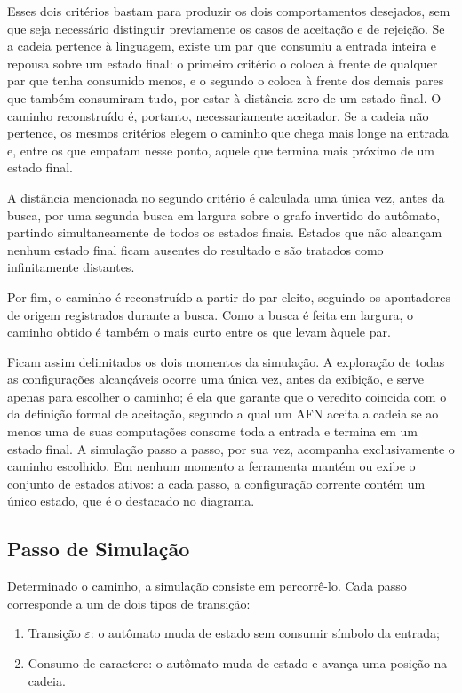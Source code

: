 \documentclass[
    12pt
    ,oneside
    ,a4paper
    ,chapter=TITLE
    ,section=TITLE
    ,sumario=abnt-6027-2012]{abntex2}
\begin{document}
Esses dois critérios bastam para produzir os dois comportamentos desejados, sem que
seja necessário distinguir previamente os casos de aceitação e de rejeição. Se a cadeia
pertence à linguagem, existe um par que consumiu a entrada inteira e repousa sobre um
estado final: o primeiro critério o coloca à frente de qualquer par que tenha consumido
menos, e o segundo o coloca à frente dos demais pares que também consumiram tudo, por
estar à distância zero de um estado final. O caminho reconstruído é, portanto,
necessariamente aceitador. Se a cadeia não pertence, os mesmos critérios elegem o
caminho que chega mais longe na entrada e, entre os que empatam nesse ponto, aquele que
termina mais próximo de um estado final.

A distância mencionada no segundo critério é calculada uma única vez, antes da busca,
por uma segunda busca em largura sobre o grafo invertido do autômato, partindo
simultaneamente de todos os estados finais. Estados que não alcançam nenhum estado
final ficam ausentes do resultado e são tratados como infinitamente distantes.

Por fim, o caminho é reconstruído a partir do par eleito, seguindo os apontadores de
origem registrados durante a busca. Como a busca é feita em largura, o caminho obtido é
também o mais curto entre os que levam àquele par.

Ficam assim delimitados os dois momentos da simulação. A exploração de todas as
configurações alcançáveis ocorre uma única vez, antes da exibição, e serve apenas para
escolher o caminho; é ela que garante que o veredito coincida com o da definição formal
de aceitação, segundo a qual um AFN aceita a cadeia se ao menos uma de suas computações
consome toda a entrada e termina em um estado final. A simulação passo a passo, por sua
vez, acompanha exclusivamente o caminho escolhido. Em nenhum momento a ferramenta mantém
ou exibe o conjunto de estados ativos: a cada passo, a configuração corrente contém um
único estado, que é o destacado no diagrama.

\subsection{Passo de Simulação}
\label{sec:impl-passo}

Determinado o caminho, a simulação consiste em percorrê-lo. Cada passo corresponde a um
de dois tipos de transição:

\begin{enumerate}
    \item Transição $\varepsilon$: o autômato muda de estado sem consumir símbolo da
          entrada;
    \item Consumo de caractere: o autômato muda de estado e avança uma posição na
          cadeia.
\end{enumerate}
\end{document}
